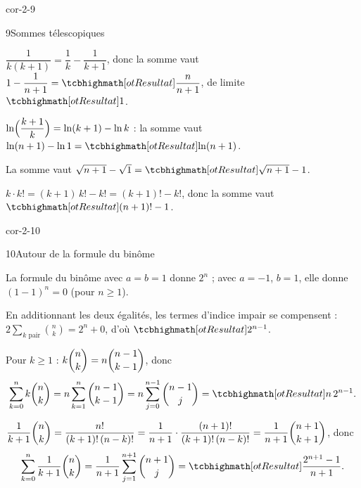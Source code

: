 \begin{blocLivre}{cor-2-9}
\begin{corrige}{9}{Sommes télescopiques}
\begin{questions}
  \item $\dfrac{1}{k(k+1)}=\dfrac{1}{k}-\dfrac{1}{k+1}$, donc la somme vaut
    $1-\dfrac{1}{n+1}=\res{\dfrac{n}{n+1}}$, de limite $\res{1}$.
  \item $\ln\Bigl(\dfrac{k+1}{k}\Bigr)=\ln(k+1)-\ln k$ : la somme vaut
    $\ln(n+1)-\ln1=\res{\ln(n+1)}$.
  \item La somme vaut $\sqrt{n+1}-\sqrt{1}=\res{\sqrt{n+1}-1}$.
  \item $k\cdot k!=(k+1)\,k!-k!=(k+1)!-k!$, donc la somme vaut
    $\res{(n+1)!-1}$.
\end{questions}
\end{corrige}
\end{blocLivre}

\begin{blocLivre}{cor-2-10}
\begin{corrige}{10}{Autour de la formule du binôme}
\begin{questions}
  \item La formule du binôme avec $a=b=1$ donne $2^{n}$ ; avec $a=-1$, $b=1$,
    elle donne $(1-1)^{n}=0$ (pour $n\geq1$).
  \item En additionnant les deux égalités, les termes d'indice impair se
    compensent : $2\displaystyle\sum_{k\text{ pair}}\binom{n}{k}=2^{n}+0$, d'où
    $\res{2^{n-1}}$.
  \item Pour $k\geq1$ : $k\dbinom{n}{k}=n\dbinom{n-1}{k-1}$, donc
    \[
      \sum_{k=0}^{n}k\binom{n}{k}=n\sum_{k=1}^{n}\binom{n-1}{k-1}
      =n\sum_{j=0}^{n-1}\binom{n-1}{j}=\res{n\,2^{n-1}}.
    \]
  \item $\dfrac{1}{k+1}\dbinom{n}{k}=\dfrac{n!}{(k+1)!\,(n-k)!}
    =\dfrac{1}{n+1}\cdot\dfrac{(n+1)!}{(k+1)!\,(n-k)!}=\dfrac{1}{n+1}\dbinom{n+1}{k+1}$, donc
    \[
      \sum_{k=0}^{n}\frac{1}{k+1}\binom{n}{k}
      =\frac{1}{n+1}\sum_{j=1}^{n+1}\binom{n+1}{j}=\res{\frac{2^{n+1}-1}{n+1}}.
    \]
\end{questions}
\end{corrige}
\end{blocLivre}

